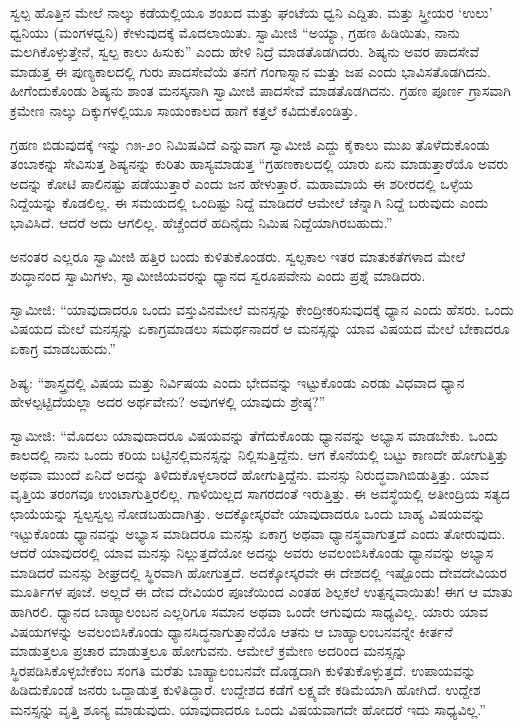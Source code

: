  ಸ್ವಲ್ಪ ಹೊತ್ತಿನ ಮೇಲೆ ನಾಲ್ಕು ಕಡೆಯಲ್ಲಿಯೂ ಶಂಖದ ಮತ್ತು ಘಂಟೆಯ ಧ್ವನಿ ಎದ್ದಿತು. ಮತ್ತು ಸ್ತ್ರೀಯರ ‘ಉಲು’ ಧ್ವನಿಯು (ಮಂಗಳಧ್ವನಿ) ಕೇಳುವುದಕ್ಕೆ ಮೊದಲಾಯಿತು. ಸ್ವಾಮೀಜಿ “ಅಯ್ಯಾ, ಗ್ರಹಣ ಹಿಡಿಯಿತು, ನಾನು ಮಲಗಿಕೊಳ್ಳುತ್ತೇನೆ, ಸ್ವಲ್ಪ ಕಾಲು ಹಿಸುಕು” ಎಂದು ಹೇಳಿ ನಿದ್ರೆ ಮಾಡತೊಡಗಿದರು. ಶಿಷ್ಯನು ಅವರ ಪಾದಸೇವೆ ಮಾಡುತ್ತ ಈ ಪುಣ್ಯಕಾಲದಲ್ಲಿ ಗುರು ಪಾದಸೇವೆಯೆ ತನಗೆ ಗಂಗಾಸ್ನಾನ ಮತ್ತು ಜಪ ಎಂದು ಭಾವಿಸತೊಡಗಿದನು. ಹೀಗೆಂದುಕೊಂಡು ಶಿಷ್ಯನು ಶಾಂತ ಮನಸ್ಕನಾಗಿ ಸ್ವಾಮೀಜಿ ಪಾದಸೇವೆ ಮಾಡತೊಡಗಿದನು. ಗ್ರಹಣ ಪೂರ್ಣ ಗ್ರಾಸವಾಗಿ ಕ್ರಮೇ‌ಣ ನಾಲ್ಕು ದಿಕ್ಕುಗಳಲ್ಲಿಯೂ ಸಾಯಂಕಾಲದ ಹಾಗೆ ಕತ್ತಲೆ ಕವಿದುಕೊಂಡಿತ್ತು. 

ಗ್ರಹಣ ಬಿಡುವುದಕ್ಕೆ ಇನ್ನು ೧೫-೨೦ ನಿಮಿಷವಿದೆ ಎನ್ನುವಾಗ ಸ್ವಾಮೀಜಿ ಎದ್ದು ಕೈಕಾಲು ಮುಖ ತೊಳೆದುಕೊಂಡು ತಂಬಾಕನ್ನು ಸೇವಿಸುತ್ತ ಶಿಷ್ಯನನ್ನು ಕುರಿತು ಹಾಸ್ಯಮಾಡುತ್ತ “ಗ್ರಹಣಕಾಲದಲ್ಲಿ ಯಾರು ಏನು ಮಾಡುತ್ತಾರೆಯೊ ಅವರು ಅದನ್ನು ಕೋಟಿ ಪಾಲಿನಷ್ಟು ಪಡೆಯುತ್ತಾರೆ ಎಂದು ಜನ ಹೇಳುತ್ತಾರೆ. ಮಹಾಮಾಯೆ ಈ ಶರೀರದಲ್ಲಿ ಒಳ್ಳೆಯ ನಿದ್ದೆಯನ್ನು ಕೊಡಲಿಲ್ಲ. ಈ ಸಮಯದಲ್ಲಿ ಒಂದಿಷ್ಟು ನಿದ್ದೆ ಮಾಡಿದರೆ ಆಮೇಲೆ ಚೆನ್ನಾಗಿ ನಿದ್ದೆ ಬರುವುದು ಎಂದು ಭಾವಿಸಿದೆ. ಆದರೆ ಅದು ಆಗಲಿಲ್ಲ. ಹೆಚ್ಚೆಂದರೆ ಹದಿನೈದು ನಿಮಿಷ ನಿದ್ದೆಯಾಗಿರಬಹುದು.” 

 ಅನಂತರ ಎಲ್ಲರೂ ಸ್ವಾಮೀಜಿ ಹತ್ತಿರ ಬಂದು ಕುಳಿತುಕೊಂಡರು. ಸ್ವಲ್ಪಕಾಲ ಇತರ ಮಾತುಕತೆಗಳಾದ ಮೇಲೆ ಶುದ್ಧಾನಂದ ಸ್ವಾಮಿಗಳು, ಸ್ವಾಮೀಜಿಯವರನ್ನು ಧ್ಯಾನದ ಸ್ವರೂಪವೇನು ಎಂದು ಪ್ರಶ್ನೆ ಮಾಡಿದರು. 

 ಸ್ವಾಮೀಜಿ: “ಯಾವುದಾದರೂ ಒಂದು ವಸ್ತುವಿನಮೇಲೆ ಮನಸ್ಸನ್ನು ಕೇಂದ್ರೀಕರಿಸುವುದಕ್ಕೆ ಧ್ಯಾನ ಎಂದು ಹೆಸರು. ಒಂದು ವಿಷಯದ ಮೇಲೆ ಮನಸ್ಸನ್ನು ಏಕಾಗ್ರಮಾಡಲು ಸಮರ್ಥನಾದರೆ ಆ ಮನಸ್ಸನ್ನು ಯಾವ ವಿಷಯದ ಮೇಲೆ ಬೇಕಾದರೂ ಏಕಾಗ್ರ ಮಾಡಬಹುದು.” 

 ಶಿಷ್ಯ: “ಶಾಸ್ತ್ರದಲ್ಲಿ ವಿಷಯ ಮತ್ತು ನಿರ್ವಿಷಯ ಎಂದು ಭೇದವನ್ನು ಇಟ್ಟುಕೊಂಡು ಎರಡು ವಿಧವಾದ ಧ್ಯಾನ ಹೇಳಲ್ಪಟ್ಟಿದೆಯಲ್ಲಾ ಅದರ ಅರ್ಥವೇನು? ಅವುಗಳಲ್ಲಿ ಯಾವುದು ಶ್ರೇಷ್ಠ?” 

 ಸ್ವಾಮೀಜಿ: “ಮೊದಲು ಯಾವುದಾದರೂ ವಿಷಯವನ್ನು ತೆಗೆದುಕೊಂಡು ಧ್ಯಾನವನ್ನು ಅಭ್ಯಾಸ ಮಾಡಬೇಕು. ಒಂದು ಕಾಲದಲ್ಲಿ ನಾನು ಒಂದು ಕರಿಯ ಬಟ್ಟಿನಲ್ಲಿ\break ಮನಸ್ಸನ್ನು ನಿಲ್ಲಿಸುತ್ತಿದ್ದೆನು. ಆಗ ಕೊನೆಯಲ್ಲಿ ಬಟ್ಟು ಕಾಣದೇ ಹೋಗುತ್ತಿತ್ತು ಅಥವಾ ಮುಂದೆ ಏನಿದೆ ಅದನ್ನು ತಿಳಿದುಕೊಳ್ಳಲಾರದೆ ಹೋಗುತ್ತಿದ್ದೆನು. ಮನಸ್ಸು ನಿರುದ್ಧವಾಗಿಬಿಡುತ್ತಿತ್ತು. ಯಾವ ವೃತ್ತಿಯ ತರಂಗವೂ ಉಂಟಾಗುತ್ತಿರಲಿಲ್ಲ. ಗಾಳಿಯಿಲ್ಲದ ಸಾಗರದಂತೆ ಇರುತ್ತಿತ್ತು. ಈ ಅವಸ್ಥೆಯಲ್ಲಿ ಅತೀಂದ್ರಿಯ ಸತ್ಯದ ಛಾಯೆಯನ್ನು ಸ್ವಲ್ಪಸ್ವಲ್ಪ ನೋಡಬಹುದಾಗಿತ್ತು. ಅದಕ್ಕೋಸ್ಕರವೇ ಯಾವುದಾದರೂ ಒಂದು ಬಾಹ್ಯ ವಿಷಯವನ್ನು ಇಟ್ಟುಕೊಂಡು ಧ್ಯಾನವನ್ನು ಅಭ್ಯಾಸ ಮಾಡಿದರೂ ಮನಸ್ಸು ಏಕಾಗ್ರ ಅಥವಾ ಧ್ಯಾನಸ್ಥವಾಗುತ್ತದೆ ಎಂದು ತೋರುವುದು. ಆದರೆ ಯಾವುದರಲ್ಲಿ ಯಾವ ಮನಸ್ಸು ನಿಲ್ಲುತ್ತದೆಯೋ ಅದನ್ನು ಅವರು ಅವಲಂಬಿಸಿಕೊಂಡು ಧ್ಯಾನವನ್ನು ಅಭ್ಯಾಸ ಮಾಡಿದರೆ ಮನಸ್ಸು ಶೀಘ್ರದಲ್ಲಿ ಸ್ಥಿರವಾಗಿ ಹೋಗುತ್ತದೆ. ಅದಕ್ಕೋಸ್ಕರವೇ ಈ ದೇಶದಲ್ಲಿ ಇಷ್ಟೊಂದು ದೇವದೇವಿಯರ ಮೂರ್ತಿಗಳ ಪೂಜೆ. ಅಲ್ಲದೆ ಈ ದೇವ ದೇವಿಯರ ಪೂಜೆಯಿಂದ ಎಂತಹ ಶಿಲ್ಪಕಲೆ ಉತ್ಪನ್ನವಾಯಿತು! ಈಗ ಆ ಮಾತು ಹಾಗಿರಲಿ. ಧ್ಯಾನದ ಬಾಹ್ಯಾಲಂಬನ ಎಲ್ಲರಿಗೂ ಸಮಾನ ಅಥವಾ ಒಂದೇ ಆಗುವುದು ಸಾಧ್ಯವಿಲ್ಲ. ಯಾರು ಯಾವ ವಿಷಯಗಳನ್ನು ಅವಲಂಬಿಸಿಕೊಂಡು ಧ್ಯಾನಸಿದ್ಧನಾಗುತ್ತಾನೆಯೊ ಆತನು ಆ ಬಾಹ್ಯಾಲಂಬನವನ್ನೇ ಕೀರ್ತನೆ ಮಾಡುತ್ತಲೂ ಪ್ರಚಾರ ಮಾಡುತ್ತಲೂ ಹೋಗುವನು. ಆಮೇಲೆ ಕ್ರಮೇಣ ಅದರಿಂದ ಮನಸ್ಸನ್ನು ಸ್ಥಿರಪಡಿಸಿಕೊಳ್ಳಬೇಕೆಂಬ ಸಂಗತಿ ಮರೆತು ಬಾಹ್ಯಾಲಂಬನವೇ ದೊಡ್ಡದಾಗಿ ಕುಳಿತುಕೊಳ್ಳುತ್ತದೆ. ಉಪಾಯವನ್ನು ಹಿಡಿದುಕೊಂಡೆ ಜನರು ಒದ್ದಾಡುತ್ತ ಕುಳಿತಿದ್ದಾರೆ. ಉದ್ದೇಶದ ಕಡೆಗೆ ಲಕ್ಷ್ಯವೇ ಕಡಿಮೆಯಾಗಿ ಹೋಗಿದೆ. ಉದ್ದೇಶ ಮನಸ್ಸನ್ನು ವೃತ್ತಿ ಶೂನ್ಯ ಮಾಡುವುದು. ಯಾವುದಾದರೂ ಒಂದು ವಿಷಯವಾಗದೇ ಹೋದರೆ ಇದು ಸಾಧ್ಯವಿಲ್ಲ.” 

